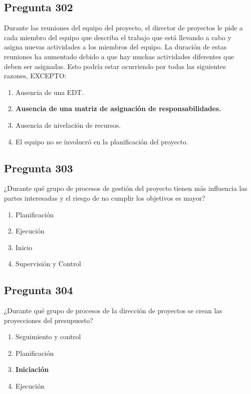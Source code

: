 \documentclass[11pt,a4paper]{article}
\begin{document}
\subsection*{Pregunta 302}
Durante las reuniones del equipo del proyecto, el director de proyectos le pide a cada miembro del equipo que describa el trabajo que está llevando a cabo y asigna nuevas actividades a los miembros del equipo. La duración de estas reuniones ha aumentado debido a que hay muchas actividades diferentes que deben ser asignadas. Esto podría estar ocurriendo por todas las siguientes razones, EXCEPTO:

\begin{enumerate}[label=\alph*)]
  \item Ausencia de una EDT.
  \item \textbf{Ausencia de una matriz de asignación de responsabilidades.}
  \item Ausencia de nivelación de recursos.
  \item El equipo no se involucró en la planificación del proyecto.
\end{enumerate}

\subsection*{Pregunta 303}
¿Durante qué grupo de procesos de gestión del proyecto tienen más influencia las partes interesadas y el riesgo de no cumplir los objetivos es mayor?

\begin{enumerate}[label=\alph*)]
  \item Planificación
  \item Ejecución
  \item Inicio
  \item Supervisión y Control
\end{enumerate}

\subsection*{Pregunta 304}
¿Durante qué grupo de procesos de la dirección de proyectos se crean las proyecciones del presupuesto?

\begin{enumerate}[label=\alph*)]
  \item Seguimiento y control
  \item Planificación
  \item \textbf{Iniciación}
  \item Ejecución
\end{enumerate}
\end{document}
